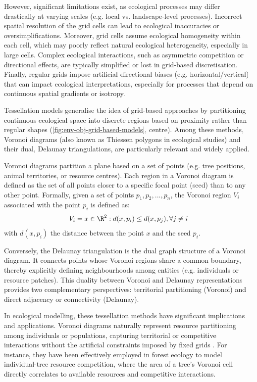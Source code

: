 However, significant limitations exist, as ecological processes may differ drastically at varying scales (e.g. local vs. landscape-level processes). Incorrect spatial resolution of the grid cells can lead to ecological inaccuracies or oversimplifications. Moreover, grid cells assume ecological homogeneity within each cell, which may poorly reflect natural ecological heterogeneity, especially in large cells. Complex ecological interactions, such as asymmetric competition or directional effects, are typically simplified or lost in grid-based discretisation. Finally, regular grids impose artificial directional biases (e.g. horizontal/vertical) that can impact ecological interpretations, especially for processes that depend on continuous spatial gradients or isotropy.


Tessellation models generalise the idea of grid-based approaches by partitioning continuous ecological space into discrete regions based on proximity rather than regular shapes (\cref{fig:env-obj-grid-based-models}, centre). Among these methods, Voronoi diagrams (also known as Thiessen polygons in ecological studies) and their dual, Delaunay triangulations, are particularly relevant and widely applied.

Voronoi diagrams partition a plane based on a set of points (e.g. tree positions, animal territories, or resource centres). Each region in a Voronoi diagram is defined as the set of all points closer to a specific focal point (seed) than to any other point. Formally, given a set of points ${p_1, p_2, ..., p_n}$, the Voronoi region $V_i$ associated with the point $p_i$ is defined as:
\begin{align}
V_i = { x \in \R^2 : d(x, p_i) \leq d(x, p_j), \forall j \neq i }
\end{align}
with $d(x, p_i)$ the distance between the point $x$ and the seed $p_i$.

Conversely, the Delaunay triangulation is the dual graph structure of a Voronoi diagram. It connects points whose Voronoi regions share a common boundary, thereby explicitly defining neighbourhoods among entities (e.g. individuals or resource patches). This duality between Voronoi and Delaunay representations provides two complementary perspectives: territorial partitioning (Voronoi) and direct adjacency or connectivity (Delaunay).

In ecological modelling, these tessellation methods have significant implications and applications. Voronoi diagrams naturally represent resource partitioning among individuals or populations, capturing territorial or competitive interactions without the artificial constraints imposed by fixed grids \cite{Castle2006}. For instance, they have been effectively employed in forest ecology to model individual-tree resource competition, where the area of a tree's Voronoi cell directly correlates to available resources and competitive interactions.

